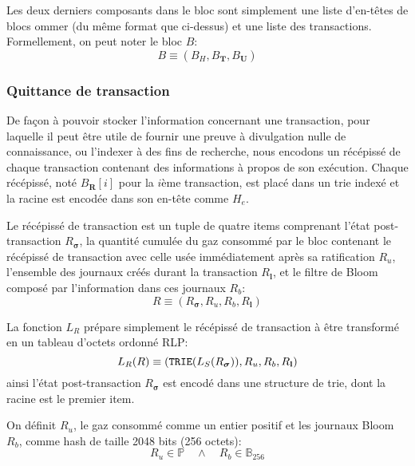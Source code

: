\documentclass[9pt,oneside]{amsart}
\begin{document}
\begin{multicols}{2}
Les deux derniers composants dans le bloc sont simplement une liste d'en-têtes de blocs ommer (du même format que ci-dessus) et une liste des transactions. Formellement, on peut noter le bloc $B$:
\begin{equation}
B \equiv (B_H, B_\mathbf{T}, B_\mathbf{U})
\end{equation}

\subsubsection{Quittance de transaction}

De façon à pouvoir stocker l'information concernant une transaction, pour laquelle il peut être utile de fournir une preuve à divulgation nulle de connaissance, ou l'indexer à des fins de recherche, nous encodons un récépissé de chaque transaction contenant des informations à propos de son exécution. Chaque récépissé, noté $B_\mathbf{R}[i]$ pour la $i$ème transaction, est placé dans un trie indexé et la racine est encodée dans son en-tête comme $H_e$.

Le récépissé de transaction est un tuple de quatre items comprenant l'état post-transaction $R_{\boldsymbol{\sigma}}$, la quantité cumulée du gaz consommé par le bloc contenant le récépissé de transaction avec celle usée immédiatement après sa ratification $R_u$, l'ensemble des journaux créés durant la transaction $R_\mathbf{l}$, et le filtre de Bloom composé par l'information dans ces journaux $R_b$:
\begin{equation}
R \equiv (R_{\boldsymbol{\sigma}}, R_u, R_b, R_\mathbf{l})
\end{equation}

La fonction $L_R$ prépare simplement le récépissé de transaction à être transformé en un tableau d'octets ordonné RLP:
\begin{equation}
L_R(R) \equiv (\mathtt{\small TRIE}(L_S(R_{\boldsymbol{\sigma}})), R_u, R_b, R_\mathbf{l})
\end{equation}
ainsi l'état post-transaction $R_{\boldsymbol{\sigma}}$ est encodé dans une structure de trie, dont la racine est le premier item.

On définit $R_u$, le gaz consommé comme un entier positif et les journaux Bloom $R_b$, comme hash de taille 2048 bits (256 octets):
\begin{equation}
R_u \in \mathbb{P} \quad \wedge \quad R_b \in \mathbb{B}_{256}
\end{equation}



\end{multicols}
\end{document}
